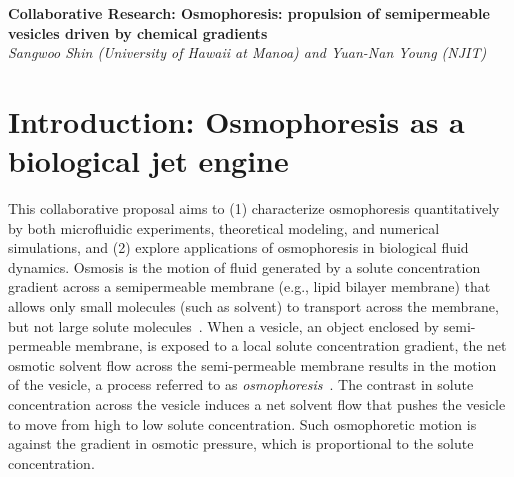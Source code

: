 \documentclass[11pt]{article}
\begin{document}
\noindent
\begin{center}
{\large \bf 
Collaborative Research: Osmophoresis: propulsion of semipermeable vesicles driven by chemical gradients\\}
{\it Sangwoo Shin (University of Hawaii at Manoa) and Yuan-Nan Young (NJIT)}
\end{center}

\section{Introduction: Osmophoresis as a biological jet engine}

This collaborative proposal aims to (1) characterize osmophoresis
quantitatively by both microfluidic experiments, theoretical modeling,
and numerical simulations, and (2) explore applications of osmophoresis
in biological fluid dynamics.  Osmosis is the motion of fluid generated
by a solute concentration gradient across a semipermeable membrane
(e.g., lipid bilayer membrane) that allows only small molecules (such as
solvent) to transport across the membrane, but not large solute
molecules~\cite{anderson1974}.  When a vesicle, an object enclosed by
semi-permeable membrane, is exposed to a local solute concentration
gradient, the net osmotic solvent flow across the semi-permeable
membrane results in the motion of the vesicle, a process referred to as
{\em osmophoresis}~\cite{anderson1983,anderson1986,gordon1981}.  The
contrast in solute concentration across the vesicle induces a net
solvent flow that pushes the vesicle to move from high to low solute
concentration. Such osmophoretic motion is against the gradient in
osmotic pressure, which is proportional to the solute concentration.
\end{document}
